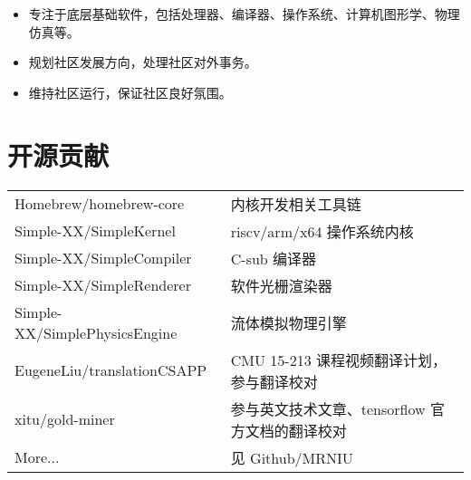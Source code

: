 \documentclass{resume}
\begin{document}
\begin{itemize}
  \item 专注于底层基础软件，包括处理器、编译器、操作系统、计算机图形学、物理仿真等。
  \item 规划社区发展方向，处理社区对外事务。
  \item 维持社区运行，保证社区良好氛围。
\end{itemize}

\section{开源贡献}
\begin{tabular}{ll}
  Homebrew/homebrew-core & 内核开发相关工具链 \\
  Simple-XX/SimpleKernel & riscv/arm/x64 操作系统内核 \\
  Simple-XX/SimpleCompiler & C-sub 编译器 \\
  Simple-XX/SimpleRenderer & 软件光栅渲染器 \\
  Simple-XX/SimplePhysicsEngine & 流体模拟物理引擎 \\
  EugeneLiu/translationCSAPP & CMU 15-213 课程视频翻译计划，参与翻译校对 \\
  xitu/gold-miner & 参与英文技术文章、tensorflow 官方文档的翻译校对 \\
  More... & 见 Github/MRNIU
\end{tabular}
\sectionsep
\end{document}
